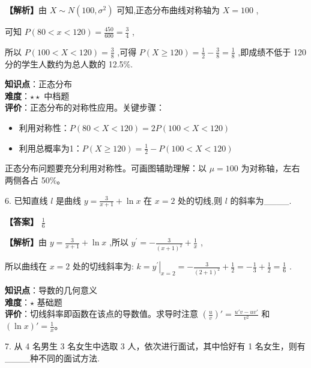 \documentclass[10pt]{article}
\begin{document}
\textbf{【解析】}由 \(X \sim  N\left( {{100},{\sigma }^{2}}\right)\) 可知,正态分布曲线对称轴为 \(X = {100}\) ,

可知 \(P\left( {{80} < x < {120}}\right)  = \frac{450}{600} = \frac{3}{4}\) ,

所以 \(P\left( {{100} < X < {120}}\right)  = \frac{3}{8}\) ,可得 \(P\left( {X \geq  {120}}\right)  = \frac{1}{2} - \frac{3}{8} = \frac{1}{8}\) ,即成绩不低于 120 分的学生人数约为总人数的 12.5\%.

\begin{analysisbox}[考点分析]
\textbf{知识点}：正态分布\\
\textbf{难度}：\(\star\star\) 中档题\\
\textbf{评价}：正态分布的对称性应用。关键步骤：
\begin{itemize}
\item 利用对称性：\(P(80 < X < 120) = 2P(100 < X < 120)\)
\item 利用总概率为1：\(P(X \geq 120) = \frac{1}{2} - P(100 < X < 120)\)
\end{itemize}
\end{analysisbox}

\begin{tipbox}[教学提示]
正态分布问题要充分利用对称性。可画图辅助理解：以 \(\mu = 100\) 为对称轴，左右两侧各占 50\%。
\end{tipbox}

6. 已知直线 \(l\) 是曲线 \(y = \frac{3}{x + 1} + \ln x\) 在 \(x = 2\) 处的切线,则 \(l\) 的斜率为\_\_\_\_.

\textbf{【答案】} \(\frac{1}{6}\)

\textbf{【解析】}由 \(y = \frac{3}{x + 1} + \ln x\) ,所以 \({y}^{\prime } =  - \frac{3}{{\left( x + 1\right) }^{2}} + \frac{1}{x}\) ,

所以曲线在 \(x = 2\) 处的切线斜率为: \(k = {\left. {y}^{\prime }\right| }_{x = 2} =  - \frac{3}{{\left( 2 + 1\right) }^{2}} + \frac{1}{2} =  - \frac{1}{3} + \frac{1}{2} = \frac{1}{6}\) .

\begin{analysisbox}[考点分析]
\textbf{知识点}：导数的几何意义\\
\textbf{难度}：\(\star\) 基础题\\
\textbf{评价}：切线斜率即函数在该点的导数值。求导时注意 \((\frac{u}{v})' = \frac{u'v - uv'}{v^2}\) 和 \((\ln x)' = \frac{1}{x}\)。
\end{analysisbox}

7. 从 4 名男生 3 名女生中选取 3 人，依次进行面试，其中恰好有 1 名女生，则有\_\_\_\_种不同的面试方法.
\end{document}
